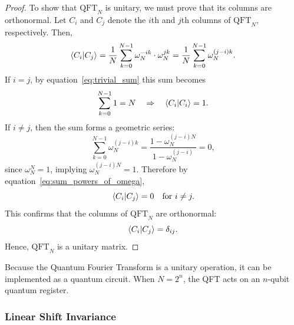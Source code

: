 \begin{proof}
To show that \( \text{QFT}_N \) is unitary, we must prove that its columns are orthonormal. Let \( C_i \) and \( C_j \) denote the \( i \)th and \( j \)th columns of \( \text{QFT}_N \), respectively. Then,
\begin{equation}
    \braket{C_i | C_j} = \frac{1}{N} \sum_{k=0}^{N-1} \omega_N^{-ik} \cdot \omega_N^{jk} = \frac{1}{N} \sum_{k=0}^{N-1} \omega_N^{(j - i)k}.
\end{equation}
If \( i = j \), by equation~\eqref{eq:trivial_sum} this sum becomes
\[
    \sum_{k=0}^{N-1} 1 = N \quad \Rightarrow \quad \braket{C_i | C_i} = 1.
\]
If \( i \neq j \), then the sum forms a geometric series:
\begin{equation}
    \sum_{k=0}^{N-1} \omega_N^{(j - i)k} = \frac{1 - \omega_N^{(j - i)N}}{1 - \omega_N^{(j - i)}} = 0,
\end{equation}
since \( \omega_N^N = 1 \), implying \( \omega_N^{(j - i)N} = 1 \). Therefore by equation~\eqref{eq:sum_powers_of_omega},
\[
    \braket{C_i | C_j} = 0 \quad \text{for } i \neq j.
\]
This confirms that the columns of \( \text{QFT}_N \) are orthonormal:
\[
    \braket{C_i | C_j} = \delta_{ij}.
\]
Hence, \( \text{QFT}_N \) is a unitary matrix.
\end{proof}

Because the Quantum Fourier Transform is a unitary operation, it can be implemented as a quantum circuit. When \( N = 2^n \), the QFT acts on an \( n \)-qubit quantum register.

   \subsubsection{Linear Shift Invariance}

